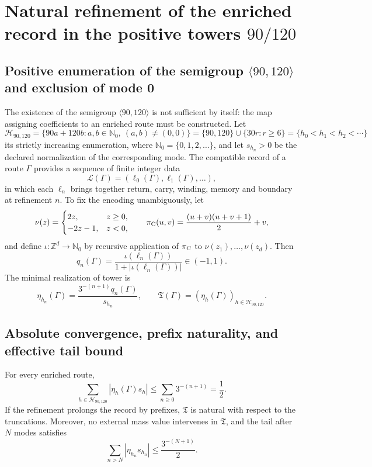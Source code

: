 \section{Natural refinement of the enriched record in the positive towers \texorpdfstring{\(90/120\)}{90/120}}

\subsection{Positive enumeration of the semigroup \texorpdfstring{\(\langle90,120\rangle\)}{<90,120>} and exclusion of mode 0}

The existence of the semigroup \(\langle90,120\rangle\) is not sufficient by itself:
the map assigning coefficients to an enriched route must be constructed. Let
\[
 \mathcal H_{90,120}
 =\{90a+120b:a,b\in\mathbb N_0,\ (a,b)\ne(0,0)\}
 =\{90,120\}\cup\{30r:r\geq6\}
 =\{h_0<h_1<h_2<\cdots\}
\]
its strictly increasing enumeration, where \(\mathbb N_0=\{0,1,2,\ldots\}\),
and let \(s_{h_n}>0\) be the declared normalization of the corresponding mode. The
compatible record of a route
\(\Gamma\) provides a sequence of finite integer data
\[
 \mathcal L(\Gamma)=(\ell_0(\Gamma),\ell_1(\Gamma),\ldots),
\]
in which each \(\ell_n\) brings together return, carry, winding, memory and boundary
at refinement \(n\). To fix the encoding unambiguously, let
\[
 \nu(z)=
 \begin{cases}2z,&z\geq0,\\-2z-1,&z<0,\end{cases}
 \qquad
 \pi_{\rm C}(u,v)=\frac{(u+v)(u+v+1)}2+v,
\]
and define \(\iota:\mathbb Z^d\to\mathbb N_0\) by recursive application of
\(\pi_{\rm C}\) to \(\nu(z_1),\ldots,\nu(z_d)\). Then
\[
 q_n(\Gamma)
 =\frac{\iota(\ell_n(\Gamma))}
 {1+|\iota(\ell_n(\Gamma))|}\in(-1,1).
\]
The minimal realization of tower is
\[
 \eta_{h_n}(\Gamma)
 =\frac{3^{-(n+1)}q_n(\Gamma)}{s_{h_n}},
 \qquad
 \mathfrak T(\Gamma)
 =(\eta_h(\Gamma))_{h\in\mathcal H_{90,120}}.
\]

\subsection{Absolute convergence, prefix naturality, and effective tail bound}

\begin{theorem}
For every enriched route,
\[
 \sum_{h\in\mathcal H_{90,120}}|\eta_h(\Gamma)s_h|
 \leq\sum_{n\ge0}3^{-(n+1)}=\frac12.
\]
If the refinement prolongs the record by prefixes, \(\mathfrak T\) is natural
with respect to the truncations. Moreover, no external mass value intervenes
in \(\mathfrak T\), and the tail after \(N\) modes satisfies
\[
 \sum_{n>N}|\eta_{h_n}s_{h_n}|
 \leq\frac{3^{-(N+1)}}2.
\]
\end{theorem}

